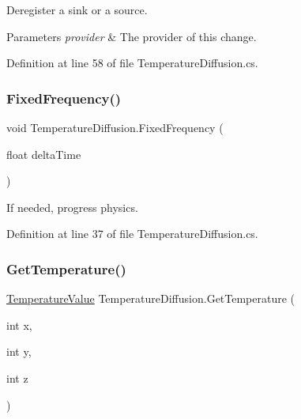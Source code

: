 Deregister a sink or a source. 


\begin{DoxyParams}{Parameters}
{\em provider} & The provider of this change. \\
\hline
\end{DoxyParams}


Definition at line 58 of file Temperature\+Diffusion.\+cs.

\mbox{\label{class_temperature_diffusion_ac079af3d36f20c9fea50c79565cd7052}} 
\subsubsection{\texorpdfstring{Fixed\+Frequency()}{FixedFrequency()}}
{\footnotesize\ttfamily void Temperature\+Diffusion.\+Fixed\+Frequency (\begin{DoxyParamCaption}\item[{float}]{delta\+Time }\end{DoxyParamCaption})}



If needed, progress physics. 



Definition at line 37 of file Temperature\+Diffusion.\+cs.

\mbox{\label{class_temperature_diffusion_ad0b5f88a095255ab3b4576b86178a762}} 
\subsubsection{\texorpdfstring{Get\+Temperature()}{GetTemperature()}}
{\footnotesize\ttfamily \hyperlink{struct_temperature_value}{Temperature\+Value} Temperature\+Diffusion.\+Get\+Temperature (\begin{DoxyParamCaption}\item[{int}]{x,  }\item[{int}]{y,  }\item[{int}]{z }\end{DoxyParamCaption})}



